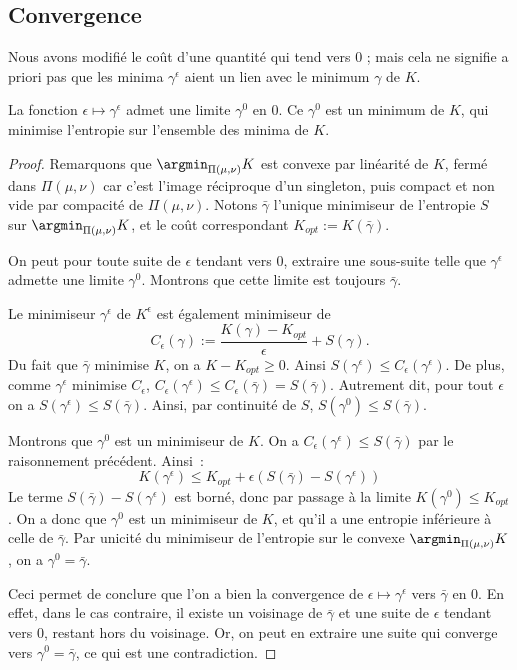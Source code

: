 \subsection{Convergence}
Nous avons modifié le coût d'une quantité qui tend vers 0 ; mais cela ne signifie a priori pas que les minima $\gamma^\epsilon$ aient un lien avec le minimum $\gamma$ de $K$.
\begin{lemma}
La fonction $\epsilon \mapsto \gamma^\epsilon$ admet une limite $\gamma^0$ en 0.
Ce $\gamma^0$ est un minimum de $K$, qui minimise l'entropie sur l'ensemble des minima de $K$.
\end{lemma}
\begin{proof}
Remarquons que $\argmin_{\Pi(\mu,\nu)} K$ est convexe par linéarité de $K$, fermé dans $\Pi(\mu,\nu)$ car c'est l'image réciproque d'un singleton, puis compact et non vide par compacité de $\Pi(\mu,\nu)$.
Notons $\bar{\gamma}$ l'unique minimiseur de l'entropie $S$ sur $\argmin_{\Pi(\mu,\nu)} K$, et le coût correspondant $K_{opt} := K(\bar{\gamma})$.

On peut pour toute suite de $\epsilon$ tendant vers 0, extraire une sous-suite telle que $\gamma^\epsilon$ admette une limite $\gamma^0$. Montrons que cette limite est toujours $\bar{\gamma}$.

Le minimiseur $\gamma^\epsilon$ de $K^\epsilon$ est également minimiseur de 
\[C_\epsilon(\gamma) := \frac{K(\gamma) - K_{opt}}{\epsilon} + S(\gamma) .\]
Du fait que $\bar{\gamma}$ minimise $K$, on a $K - K_{opt} \ge 0$. Ainsi $S(\gamma^\epsilon) \le C_\epsilon(\gamma^\epsilon)$. De plus, comme $\gamma^\epsilon$ minimise $C_\epsilon$, $C_\epsilon(\gamma^\epsilon) \le C_\epsilon(\bar{\gamma}) = S(\bar{\gamma})$. Autrement dit, pour tout $\epsilon$ on a $S(\gamma^\epsilon) \le S(\bar{\gamma})$. Ainsi, par continuité de $S$, $S(\gamma^0) \le S(\bar{\gamma})$.

Montrons que $\gamma^0$ est un minimiseur de $K$. On a $C_\epsilon(\gamma^\epsilon) \le S(\bar{\gamma})$ par le raisonnement précédent. Ainsi~:
\[K(\gamma^\epsilon) \le K_{opt} + \epsilon (S(\bar{\gamma}) - S(\gamma^\epsilon)) \]
Le terme $S(\bar{\gamma}) - S(\gamma^\epsilon)$ est borné, donc par passage à la limite $K(\gamma^0) \le K_{opt}$. On a donc que $\gamma^0$ est un minimiseur de $K$, et qu'il a une entropie inférieure à celle de $\bar{\gamma}$. Par unicité du minimiseur de l'entropie sur le convexe $\argmin_{\Pi(\mu,\nu)} K$, on a $\gamma^0 = \bar{\gamma}$.

Ceci permet de conclure que l'on a bien la convergence de $\epsilon \mapsto \gamma^\epsilon$ vers $\bar{\gamma}$ en 0. En effet, dans le cas contraire, il existe un voisinage de $\bar{\gamma}$ et une suite de $\epsilon$ tendant vers 0, restant hors du voisinage. Or, on peut en extraire une suite qui converge vers $\gamma^0 = \bar{\gamma}$, ce qui est une contradiction.
\end{proof}

